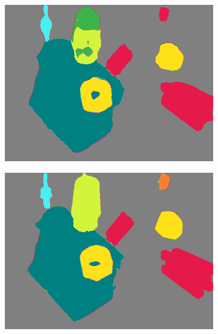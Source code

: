 \begin{figure}[h]
\begin{subfigure}{.24\textwidth}
			\includegraphics[width=1\linewidth]{images/sample_predictions/00132_mob_shape_pred}
		\end{subfigure}
		\begin{subfigure}{.24\textwidth}
			\centering
			\includegraphics[width=1\linewidth]{images/sample_predictions/00132_xcep_shape_pred}
		\end{subfigure}
		\begin{subfigure}{.24\textwidth}
			\centering

\end{subfigure}
\end{figure}
